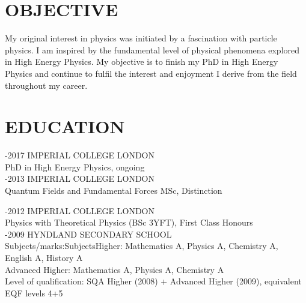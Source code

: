 \documentclass[9pt]{res} %
\begin{document}
 
 
\vspace{0.2cm}
\address{ \\44 Rue de la Combette\\ St Genis-Pouilly\\ France. 01630\\	matthew.citron09@imperial.ac.uk}
 
                                             
\begin{resume}
                                               
 
\section{OBJECTIVE}
\vspace{0.2cm}
   My original interest in physics was initiated by a fascination with particle physics. I am inspired by the fundamental level of physical phenomena explored in High Energy Physics. My objective is to finish my PhD in High Energy Physics and continue to fulfil the interest and enjoyment I derive from the field throughout my career.
   
\section{EDUCATION} 

\vspace{0.2cm}

-2017 IMPERIAL COLLEGE LONDON \\
PhD in High Energy Physics, ongoing \\

 -2013 IMPERIAL COLLEGE LONDON \\
 Quantum Fields and Fundamental Forces MSc, Distinction

 -2012 IMPERIAL COLLEGE LONDON \\
Physics with Theoretical Physics (BSc 3YFT), First Class Honours \\
-2009 HYNDLAND SECONDARY SCHOOL \\
Subjects/marks:SubjectsHigher: Mathematics A, Physics A, Chemistry A, English A, History A \\
Advanced Higher: Mathematics A, Physics A, Chemistry A  \\
Level of qualification: SQA Higher (2008) + Advanced Higher (2009), equivalent EQF levels 4+5 \\
 

\end{resume}
\end{document}
